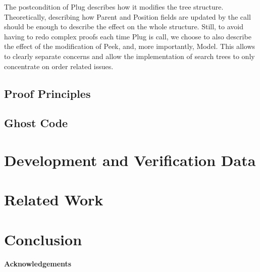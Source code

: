 \documentclass[11pt,a4paper]{article}
\begin{document}
The postcondition of Plug describes how it modifies the tree structure. Theoretically,
describing how Parent and Position fields are updated by the call should be enough to
describe the effect on the whole structure. Still, to avoid having to redo complex
proofs each time Plug is call, we choose to also describe the effect of the modification
of Peek, and, more importantly, Model. This allows to clearly separate concerns and allow
the implementation of search trees to only concentrate on order related issues.

\subsection{Proof Principles}

\subsection{Ghost Code}



\section{Development and Verification Data}

\section{Related Work}

\section{Conclusion}


\paragraph*{Acknowledgements}




\end{document}
